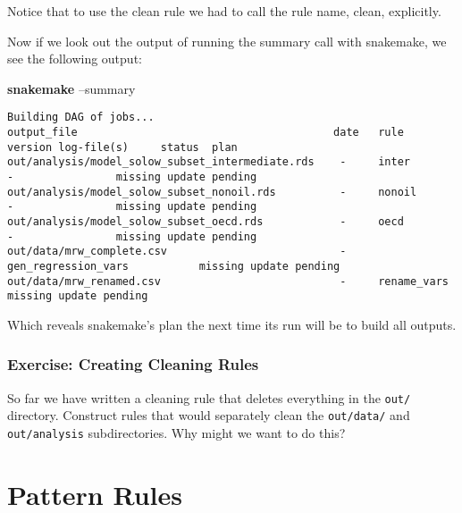 \documentclass[]{book}
\newenvironment{Shaded}{\begin{snugshade}}{\end{snugshade}}
\newcommand{\KeywordTok}[1]{\textcolor[rgb]{0.13,0.29,0.53}{\textbf{{#1}}}}
\newcommand{\NormalTok}[1]{{#1}}
\theoremstyle{definition}
\theoremstyle{definition}
\theoremstyle{definition}
\theoremstyle{remark}
\begin{document}
\begin{Shaded}
\end{Shaded}

Notice that to use the clean rule we had to call the rule name, clean,
explicitly.

Now if we look out the output of running the summary call with
snakemake, we see the following output:

\begin{Shaded}
\begin{Highlighting}[]
\KeywordTok{snakemake} \NormalTok{--summary}
\end{Highlighting}
\end{Shaded}

\begin{verbatim}
Building DAG of jobs...
output_file                                        date   rule  version log-file(s)     status  plan
out/analysis/model_solow_subset_intermediate.rds    -     inter        -                missing update pending
out/analysis/model_solow_subset_nonoil.rds          -     nonoil       -                missing update pending
out/analysis/model_solow_subset_oecd.rds            -     oecd         -                missing update pending
out/data/mrw_complete.csv                           -     gen_regression_vars           missing update pending
out/data/mrw_renamed.csv                            -     rename_vars                   missing update pending
\end{verbatim}

Which reveals snakemake's plan the next time its run will be to build
all outputs.

\subsection*{Exercise: Creating Cleaning
Rules}\label{exercise-creating-cleaning-rules}

So far we have written a cleaning rule that deletes everything in the
\texttt{out/} directory. Construct rules that would separately clean the
\texttt{out/data/} and \texttt{out/analysis} subdirectories. Why might
we want to do this?

\chapter{Pattern Rules}\label{pattern-rules}
\end{document}
